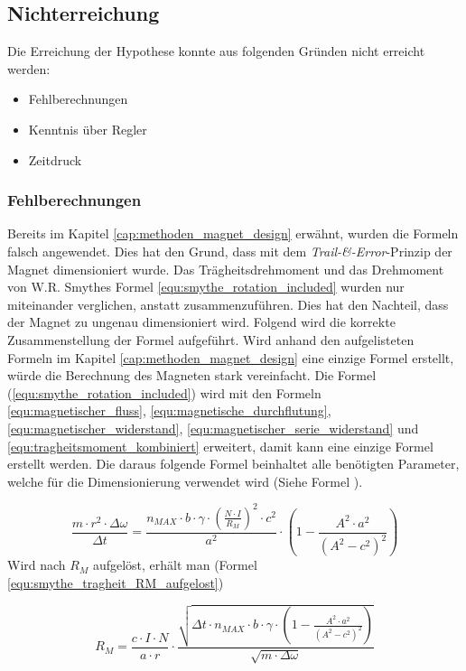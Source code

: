 \subsection{Nichterreichung}
Die Erreichung der Hypothese konnte aus folgenden Gründen nicht erreicht werden:
\begin{itemize}
  \item Fehlberechnungen
  \item Kenntnis über Regler
  \item Zeitdruck
\end{itemize}
\subsubsection{Fehlberechnungen}
Bereits im Kapitel \ref{cap:methoden_magnet_design} erwähnt, wurden die Formeln falsch angewendet. Dies hat den Grund, dass mit dem \textit{Trail-\&-Error}-Prinzip der Magnet dimensioniert wurde. Das Trägheitsdrehmoment und das Drehmoment von W.R. Smythes Formel \ref{equ:smythe_rotation_included} wurden nur miteinander verglichen, anstatt zusammenzuführen. Dies hat den Nachteil, dass der Magnet zu ungenau dimensioniert wird. Folgend wird die korrekte Zusammenstellung der Formel aufgeführt.
\newpara
Wird anhand den aufgelisteten Formeln im Kapitel \ref{cap:methoden_magnet_design} eine einzige Formel erstellt, würde die Berechnung des Magneten stark vereinfacht. Die Formel (\ref{equ:smythe_rotation_included}) wird mit den Formeln \ref{equ:magnetischer_fluss}, \ref{equ:magnetische_durchflutung}, \ref{equ:magnetischer_widerstand}, \ref{equ:magnetischer_serie_widerstand} und \ref{equ:tragheitsmoment_kombiniert} erweitert, damit kann eine einzige  Formel erstellt werden. Die daraus folgende Formel beinhaltet alle benötigten Parameter, welche für die Dimensionierung verwendet wird (Siehe Formel ).

\begin{equation}
  \label{equ:smythe_tragheit_kombiniert}
  \frac{m\cdot r^{2}\cdot \Delta\omega}{\Delta t}=\frac{n_{MAX}\cdot b\cdot \gamma\cdot (\frac{N\cdot I}{R_M})^{2}\cdot c^{2}}{a^{2}} \cdot (1-\frac{A^{2}\cdot a^{2}}{(A^{2}-c^{2})^{2}}) \tag{29}
\end{equation}
\newpara
Wird nach $R_M$ aufgelöst, erhält man (Formel \ref{equ:smythe_tragheit_RM_aufgelost})

\begin{equation}
  \label{equ:smythe_tragheit_RM_aufgelost}
  R_{M}=\frac{c\cdot I \cdot N}{a \cdot r}\cdot \frac{\sqrt{\Delta t \cdot n_{MAX}\cdot b \cdot \gamma \cdot (1-\frac{A^{2}\cdot a^{2}}{(A^{2}-c^{2})^{2}})}}{\sqrt{m\cdot\Delta\omega}} \tag{30}
\end{equation}
\newpara


